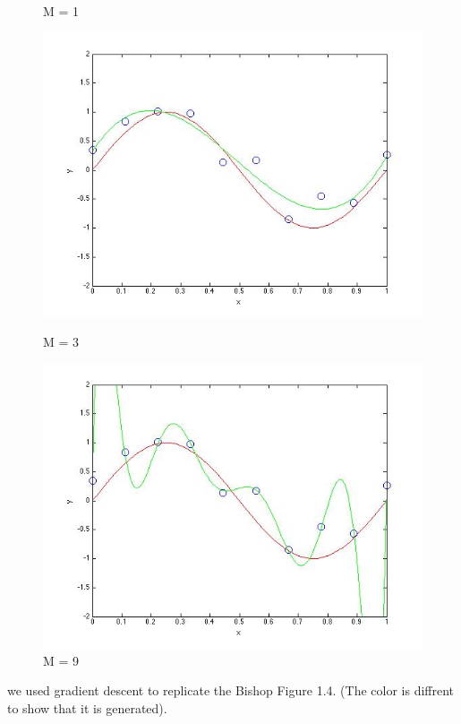 \begin{figure}[!htb]
  \caption{M = 1}\label{fig:figures/p2_M=1}
\endminipage\hfill
{}                                                                            
  \includegraphics[width=\linewidth]{figures/p2_M=3}
  \caption{M = 3}\label{fig:figures/p2_M=3}
\endminipage\hfill
{}                                                                            
  \includegraphics[width=\linewidth]{figures/p2_M=9}
  \caption{M = 9}\label{fig:figures/p2_M=9}
\endminipage\hfill
\end{figure}


we used gradient descent to replicate 
the Bishop Figure 1.4. (The color is diffrent to show that it is generated). 

